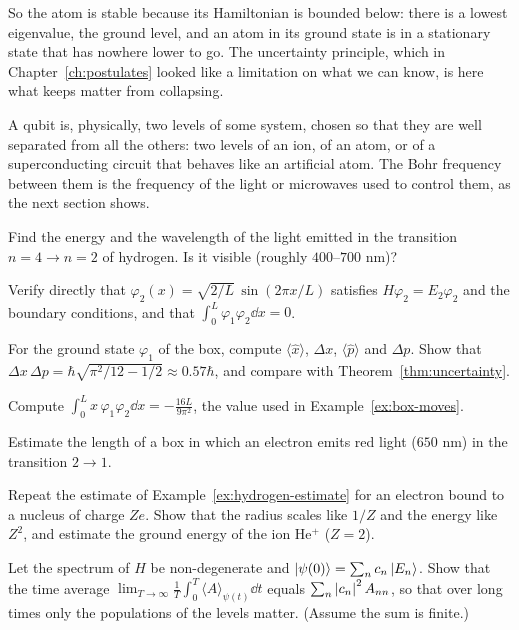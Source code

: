 So the atom is stable because its Hamiltonian is bounded below: there is a lowest eigenvalue, the ground level, and an atom in its ground state is in a stationary state that has nowhere lower to go. The uncertainty principle, which in Chapter~\ref{ch:postulates} looked like a limitation on what we can know, is here what keeps matter from collapsing.

\begin{lookahead}
  A qubit is, physically, two levels of some system, chosen so that they are well separated from all the others: two levels of an ion, of an atom, or of a superconducting circuit that behaves like an artificial atom. The Bohr frequency between them is the frequency of the light or microwaves used to control them, as the next section shows.
\end{lookahead}

\begin{exerciseset}
   Find the energy and the wavelength of the light emitted in the transition $n=4\to n=2$ of hydrogen. Is it visible (roughly $400$--$700$ nm)?

   Verify directly that $\varphi_2(x)=\sqrt{2/L}\,\sin(2\pi x/L)$ satisfies $H\varphi_2=E_2\varphi_2$ and the boundary conditions, and that $\int_0^L\varphi_1\varphi_2\dd x=0$.

   For the ground state $\varphi_1$ of the box, compute $\langle\hat x\rangle$, $\Delta x$, $\langle\hat p\rangle$ and $\Delta p$. Show that $\Delta x\,\Delta p=\hbar\sqrt{\pi^2/12-1/2}\approx0.57\hbar$, and compare with Theorem~\ref{thm:uncertainty}.

   Compute $\int_0^Lx\,\varphi_1\varphi_2\dd x=-\tfrac{16L}{9\pi^2}$, the value used in Example~\ref{ex:box-moves}.

   Estimate the length of a box in which an electron emits red light ($650$ nm) in the transition $2\to1$.

   Repeat the estimate of Example~\ref{ex:hydrogen-estimate} for an electron bound to a nucleus of charge $Ze$. Show that the radius scales like $1/Z$ and the energy like $Z^2$, and estimate the ground energy of the ion He$^+$ ($Z=2$).

   Let the spectrum of $H$ be non-degenerate and $\left|\psi(0)\right\rangle=\sum_nc_n\left|E_n\right\rangle$. Show that the time average $\lim_{T\to\infty}\frac1T\int_0^T\langle A\rangle_{\psi(t)}\dd t$ equals $\sum_n\left|c_n\right|^2A_{nn}$, so that over long times only the populations of the levels matter. (Assume the sum is finite.)
\end{exerciseset}
